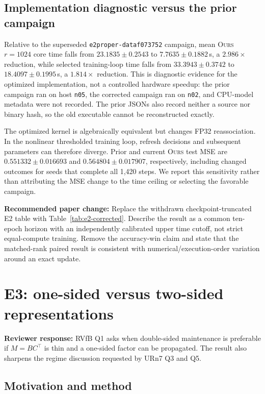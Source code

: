\documentclass[11pt]{article}
\newcommand{\ours}{\textsc{Ours}}
\newcommand{\reviewer}[1]{\textbf{Reviewer response:} #1}
\newcommand{\paperchange}[1]{\textbf{Recommended paper change:} #1}
\begin{document}
\subsection{Implementation diagnostic versus the prior campaign}

Relative to the superseded \texttt{e2proper-dataf073752} campaign, mean
\ours{} \(r=1024\) core time falls from
\(23.1835\pm0.2543\) to \(7.7635\pm0.1882\)\,s, a \(2.986\times\)
reduction, while selected training-loop time falls from
\(33.3943\pm0.3742\) to \(18.4097\pm0.1995\)\,s, a \(1.814\times\)
reduction.  This is diagnostic evidence for the optimized implementation,
not a controlled hardware speedup: the prior campaign ran on host
\texttt{n05}, the corrected campaign ran on \texttt{n02}, and CPU-model
metadata were not recorded.  The prior JSONs also record neither a source nor
binary hash, so the old executable cannot be reconstructed exactly.

The optimized kernel is algebraically equivalent but changes FP32
reassociation.  In the nonlinear thresholded training loop, refresh
decisions and subsequent parameters can therefore diverge.  Prior and current
\ours{} test MSE are \(0.551332\pm0.016693\) and
\(0.564804\pm0.017907\), respectively, including changed outcomes for seeds
that complete all 1,420 steps.  We report this sensitivity rather than
attributing the MSE change to the time ceiling or selecting the favorable
campaign.

\paperchange{Replace the withdrawn checkpoint-truncated E2 table with
Table~\ref{tab:e2-corrected}.  Describe the result as a common ten-epoch
horizon with an independently calibrated upper time cutoff, not strict
equal-compute training.  Remove the accuracy-win claim and state that the
matched-rank paired result is consistent with numerical/execution-order
variation around an exact update.}

\section{E3: one-sided versus two-sided representations}
\label{sec:e3}

\reviewer{RVfB Q1 asks when double-sided maintenance is preferable if
\(M=BC^\top\) is thin and a one-sided factor can be propagated.  The result
also sharpens the regime discussion requested by URn7 Q3 and Q5.}

\subsection{Motivation and method}
\end{document}
